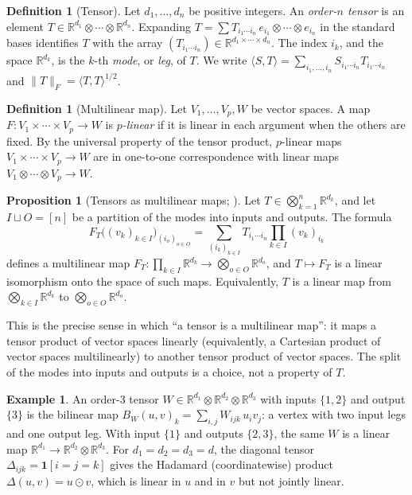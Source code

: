 \documentclass[11pt]{article}
\newcommand{\R}{\mathbb{R}}
\newcommand{\ip}[2]{\langle #1,#2\rangle}
\newcommand{\norm}[1]{\lVert #1\rVert}
\theoremstyle{definition}
\newtheorem{proposition}[theorem]{Proposition}
\newtheorem{definition}[theorem]{Definition}
\newtheorem{example}[theorem]{Example}
\numberwithin{equation}{section}
\begin{document}
\begin{definition}[Tensor]
Let $d_1,\dots,d_n$ be positive integers. An \emph{order-$n$ tensor} is an element $T\in\R^{d_1}\otimes\cdots\otimes\R^{d_n}$. Expanding $T=\sum T_{i_1\cdots i_n}\,e_{i_1}\otimes\cdots\otimes e_{i_n}$ in the standard bases identifies $T$ with the array $(T_{i_1\cdots i_n})\in\R^{d_1\times\cdots\times d_n}$. The index $i_k$, and the space $\R^{d_k}$, is the $k$-th \emph{mode}, or \emph{leg}, of $T$. We write $\ip{S}{T}=\sum_{i_1,\dots,i_n}S_{i_1\cdots i_n}T_{i_1\cdots i_n}$ and $\norm{T}_F=\ip{T}{T}^{1/2}$.
\end{definition}

\begin{definition}[Multilinear map]
Let $V_1,\dots,V_p,W$ be vector spaces. A map $F:V_1\times\cdots\times V_p\to W$ is \emph{$p$-linear} if it is linear in each argument when the others are fixed. By the universal property of the tensor product, $p$-linear maps $V_1\times\cdots\times V_p\to W$ are in one-to-one correspondence with linear maps $V_1\otimes\cdots\otimes V_p\to W$.
\end{definition}

\begin{proposition}[Tensors as multilinear maps; {\citealp[Proposition~A.1]{furman2026benign}}]\label{prop:tensor-map}
Let $T\in\bigotimes_{k=1}^n\R^{d_k}$, and let $I\sqcup O=[n]$ be a partition of the modes into inputs and outputs. The formula
\begin{equation}\label{eq:tensor-map}
F_T\big((v_k)_{k\in I}\big)_{(i_o)_{o\in O}}=\sum_{(i_k)_{k\in I}}T_{i_1\cdots i_n}\prod_{k\in I}(v_k)_{i_k}
\end{equation}
defines a multilinear map $F_T:\prod_{k\in I}\R^{d_k}\to\bigotimes_{o\in O}\R^{d_o}$, and $T\mapsto F_T$ is a linear isomorphism onto the space of such maps. Equivalently, $T$ is a linear map from $\bigotimes_{k\in I}\R^{d_k}$ to $\bigotimes_{o\in O}\R^{d_o}$.
\end{proposition}

This is the precise sense in which ``a tensor is a multilinear map'': it maps a tensor product of vector spaces linearly (equivalently, a Cartesian product of vector spaces multilinearly) to another tensor product of vector spaces. The split of the modes into inputs and outputs is a choice, not a property of $T$.

\begin{example}\label{ex:bilinear}
An order-3 tensor $W\in\R^{d_1}\otimes\R^{d_2}\otimes\R^{d_3}$ with inputs $\{1,2\}$ and output $\{3\}$ is the bilinear map $B_W(u,v)_k=\sum_{i,j}W_{ijk}\,u_iv_j$: a vertex with two input legs and one output leg. With input $\{1\}$ and outputs $\{2,3\}$, the same $W$ is a linear map $\R^{d_1}\to\R^{d_2}\otimes\R^{d_3}$. For $d_1=d_2=d_3=d$, the diagonal tensor $\Delta_{ijk}=\mathbf 1[i=j=k]$ gives the Hadamard (coordinatewise) product $\Delta(u,v)=u\odot v$, which is linear in $u$ and in $v$ but not jointly linear.
\end{example}
\end{document}
